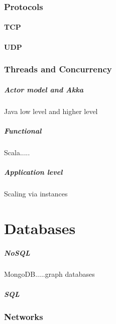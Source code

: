 \documentclass[a4paper, 11pt]{book}
\begin{document}
    \subsection{Protocols}

    \subsubsection{TCP}

    \subsubsection{UDP}

    \subsection{Threads and Concurrency}

    \paragraph{Actor model and Akka}
    Java low level and higher level

    \paragraph{Functional}
    Scala.....

    \paragraph{Application level}
    Scaling via instances


    \chapter{Databases}

    \paragraph{NoSQL}
    MongoDB.....graph databases

    \paragraph{SQL}

    \subsection{Networks}
\end{document}
